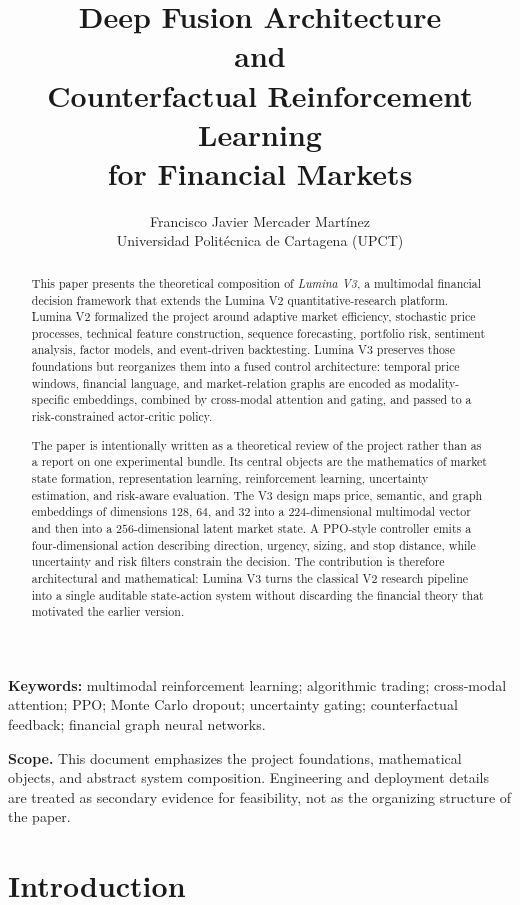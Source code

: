 \documentclass[10pt]{article}
\title{\textbf{Deep Fusion Architecture \\and\\ Counterfactual Reinforcement Learning \\for Financial Markets}}
\author{Francisco Javier Mercader Mart\'inez\\
\small Universidad Polit\'ecnica de Cartagena (UPCT)}
\date{}
\begin{document}
\maketitle

\begin{abstract}
	This paper presents the theoretical composition of \emph{Lumina V3}, a multimodal
	financial decision framework that extends the Lumina V2 quantitative-research platform.
	Lumina V2 formalized the project around adaptive market efficiency, stochastic price
	processes, technical feature construction, sequence forecasting, portfolio risk, sentiment
	analysis, factor models, and event-driven backtesting. Lumina V3 preserves those foundations
	but reorganizes them into a fused control architecture: temporal price windows, financial
	language, and market-relation graphs are encoded as modality-specific embeddings, combined by
	cross-modal attention and gating, and passed to a risk-constrained actor-critic policy.

	The paper is intentionally written as a theoretical review of the project rather than as a
	report on one experimental bundle. Its central objects are the mathematics of market state
	formation, representation learning, reinforcement learning, uncertainty estimation, and
	risk-aware evaluation. The V3 design maps price, semantic, and graph embeddings of dimensions
	\(128\), \(64\), and \(32\) into a \(224\)-dimensional multimodal vector and then into a
	\(256\)-dimensional latent market state. A PPO-style controller emits a four-dimensional
	action describing direction, urgency, sizing, and stop distance, while uncertainty and risk
	filters constrain the decision. The contribution is therefore architectural and mathematical:
	Lumina V3 turns the classical V2 research pipeline into a single auditable state-action
	system without discarding the financial theory that motivated the earlier version.
\end{abstract}

\noindent\textbf{Keywords:} multimodal reinforcement learning; algorithmic trading;
cross-modal attention; PPO; Monte Carlo dropout; uncertainty gating; counterfactual feedback;
financial graph neural networks.

\noindent\textbf{Scope.} This document emphasizes the project foundations, mathematical
objects, and abstract system composition. Engineering and deployment details are treated as
secondary evidence for feasibility, not as the organizing structure of the paper.

\section{Introduction}
\end{document}
